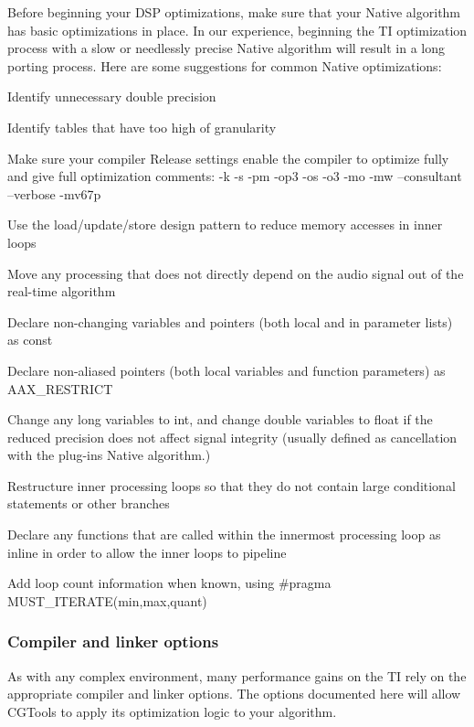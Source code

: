 \begin{DoxyEnumerate}
\item Before beginning your D\+SP optimizations, make sure that your Native algorithm has basic optimizations in place. In our experience, beginning the TI optimization process with a slow or needlessly precise Native algorithm will result in a long porting process. Here are some suggestions for common Native optimizations\+: 
\begin{DoxyItemize}
\item Identify unnecessary double precision  
\item Identify tables that have too high of granularity  
\end{DoxyItemize}
\item Make sure your compiler Release settings enable the compiler to optimize fully and give full optimization comments\+:  {\ttfamily -\/k -\/s -\/pm -\/op3 -\/os -\/o3 -\/mo -\/mw –consultant –verbose -\/mv67p}  
\item Use the load/update/store design pattern to reduce memory accesses in inner loops  
\item Move any processing that does not directly depend on the audio signal out of the real-\/time algorithm  
\item Declare non-\/changing variables and pointers (both local and in parameter lists) as {\ttfamily const}  
\item Declare non-\/aliased pointers (both local variables and function parameters) as A\+A\+X\+\_\+\+R\+E\+S\+T\+R\+I\+CT  
\item Change any {\ttfamily long} variables to{\itshape  } {\ttfamily int}, and change {\ttfamily double} variables to {\ttfamily float} if the reduced precision does not affect signal integrity (usually defined as cancellation with the plug-\/in\textquotesingle{}s Native algorithm.)  
\item Restructure inner processing loops so that they do not contain large conditional statements or other branches  
\item Declare any functions that are called within the innermost processing loop as {\ttfamily inline} in order to allow the inner loops to pipeline  
\item Add loop count information when known, using {\ttfamily \#pragma M\+U\+S\+T\+\_\+\+I\+T\+E\+R\+A\+T\+E(min,max,quant)} 
\end{DoxyEnumerate}

\hypertarget{a00832_subsection__compiler_and_linker_options}{}\subsubsection{Compiler and linker options}\label{a00832_subsection__compiler_and_linker_options}
As with any complex environment, many performance gains on the TI rely on the appropriate compiler and linker options. The options documented here will allow C\+G\+Tools to apply its optimization logic to your algorithm.

